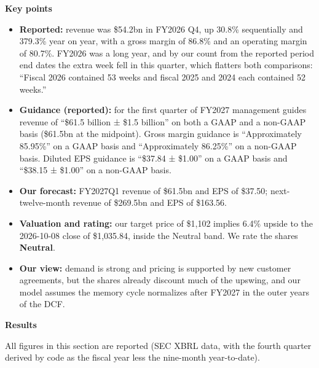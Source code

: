 \documentclass[a4paper,10pt]{article}
\begin{document}
\par\smallskip\textbf{\color{MemoBlue}Key points}\par

\begin{itemize}\setlength{\itemsep}{1pt}
\item \textbf{Reported:} revenue was \$54.2bn in FY2026 Q4, up 30.8\% sequentially and 379.3\% year on year, with a gross margin of 86.8\% and an operating margin of 80.7\%. FY2026 was a long year, and by our count from the reported period end dates the extra week fell in this quarter, which flatters both comparisons: “Fiscal 2026 contained 53 weeks and fiscal 2025 and 2024 each contained 52 weeks.”
\item \textbf{Guidance (reported):} for the first quarter of FY2027 management guides revenue of “\$61.5 billion ± \$1.5 billion” on both a GAAP and a non-GAAP basis (\$61.5bn at the midpoint). Gross margin guidance is “Approximately 85.95\%” on a GAAP basis and “Approximately 86.25\%” on a non-GAAP basis. Diluted EPS guidance is “\$37.84 ± \$1.00” on a GAAP basis and “\$38.15 ± \$1.00” on a non-GAAP basis.
\item \textbf{Our forecast:} FY2027Q1 revenue of \$61.5bn and EPS of \$37.50; next-twelve-month revenue of \$269.5bn and EPS of \$163.56.
\item \textbf{Valuation and rating:} our target price of \$1,102 implies 6.4\% upside to the 2026-10-08 close of \$1,035.84, inside the Neutral band. We rate the shares \textbf{Neutral}.
\item \textbf{Our view:} demand is strong and pricing is supported by new customer agreements, but the shares already discount much of the upswing, and our model assumes the memory cycle normalizes after FY2027 in the outer years of the DCF.
\end{itemize}

\par\smallskip\textbf{\color{MemoBlue}Results}\par

All figures in this section are reported (SEC XBRL data, with the fourth quarter derived by code as the fiscal year less the nine-month year-to-date).
\end{document}
